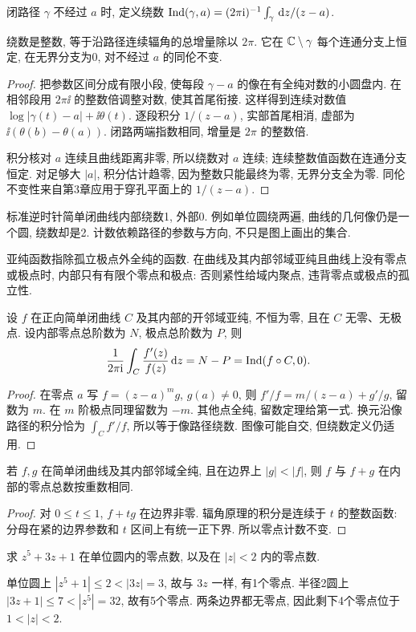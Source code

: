 \begin{definition}
闭路径 $\gamma$ 不经过 $a$ 时, 定义绕数 $\operatorname{Ind}(\gamma,a)=(2\pi\mathrm i)^{-1}\int_\gamma\,\mathrm d z/(z-a)$.
\end{definition}
\begin{proposition}\label{prop:index}
绕数是整数, 等于沿路径连续辐角的总增量除以 $2\pi$. 它在 $\mathbb C\setminus\gamma$ 每个连通分支上恒定, 在无界分支为0, 对不经过 $a$ 的同伦不变.
\end{proposition}
\begin{proof}
把参数区间分成有限小段, 使每段 $\gamma-a$ 的像在有全纯对数的小圆盘内. 在相邻段用 $2\pi\ii$ 的整数倍调整对数, 使其首尾衔接. 这样得到连续对数值 $\log|\gamma(t)-a|+\ii\theta(t)$. 逐段积分 $1/(z-a)$, 实部首尾相消, 虚部为 $\ii(\theta(b)-\theta(a))$. 闭路两端指数相同, 增量是 $2\pi$ 的整数倍.

积分核对 $a$ 连续且曲线距离非零, 所以绕数对 $a$ 连续; 连续整数值函数在连通分支恒定. 对足够大 $|a|$, 积分估计趋零, 因为整数只能最终为零, 无界分支全为零. 同伦不变性来自第3章应用于穿孔平面上的 $1/(z-a)$.
\end{proof}
标准逆时针简单闭曲线内部绕数1, 外部0. 例如单位圆绕两遍, 曲线的几何像仍是一个圆, 绕数却是2. 计数依赖路径的参数与方向, 不只是图上画出的集合.

亚纯函数指除孤立极点外全纯的函数. 在曲线及其内部邻域亚纯且曲线上没有零点或极点时, 内部只有有限个零点和极点: 否则紧性给域内聚点, 违背零点或极点的孤立性.
\begin{theorem}[辐角原理]\label{thm:argument}
设 $f$ 在正向简单闭曲线 $C$ 及其内部的开邻域亚纯, 不恒为零, 且在 $C$ 无零、无极点. 设内部零点总阶数为 $N$, 极点总阶数为 $P$, 则
\[
\frac1{2\pi\mathrm i}\int_C\frac{f'(z)}{f(z)}\,\mathrm d z=N-P=\operatorname{Ind}(f\circ C,0).
\]
\end{theorem}
\begin{proof}
在零点 $a$ 写 $f=(z-a)^mg$, $g(a)\ne0$, 则 $f'/f=m/(z-a)+g'/g$, 留数为 $m$. 在 $m$ 阶极点同理留数为 $-m$. 其他点全纯, 留数定理给第一式. 换元沿像路径的积分恰为 $\int_Cf'/f$, 所以等于像路径绕数. 图像可能自交, 但绕数定义仍适用.
\end{proof}
\begin{theorem}[Rouché]\label{thm:rouche}
若 $f,g$ 在简单闭曲线及其内部邻域全纯, 且在边界上 $|g|<|f|$, 则 $f$ 与 $f+g$ 在内部的零点总数按重数相同.
\end{theorem}
\begin{proof}
对 $0\le t\le1$, $f+tg$ 在边界非零. 辐角原理的积分是连续于 $t$ 的整数函数: 分母在紧的边界参数和 $t$ 区间上有统一正下界. 所以零点计数不变.
\end{proof}
\begin{example}
求 $z^5+3z+1$ 在单位圆内的零点数, 以及在 $|z|<2$ 内的零点数.
\end{example}
\begin{solution}
单位圆上 $|z^5+1|\le2<|3z|=3$, 故与 $3z$ 一样, 有1个零点. 半径2圆上 $|3z+1|\le7<|z^5|=32$, 故有5个零点. 两条边界都无零点, 因此剩下4个零点位于 $1<|z|<2$.
\end{solution}

